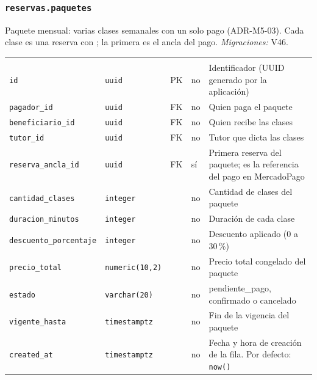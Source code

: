 \subsubsection{\texorpdfstring{\texttt{reservas.paquetes}}{reservas.paquetes}}\label{dd:reservas.paquetes}

Paquete mensual: varias clases semanales con un solo pago (ADR-M5-03). Cada clase es una reserva con ; la primera es el ancla del pago. \emph{Migraciones:} V46.

{\small
\begin{xltabular}{\textwidth}{@{}>{\raggedright\arraybackslash}p{3.6cm} >{\raggedright\arraybackslash}p{2.3cm} >{\raggedright\arraybackslash}p{1cm} >{\centering\arraybackslash}p{0.85cm} L@{}}
    \toprule
     &  &  &  &  \\
    \midrule
    \endfirsthead
    \toprule
     &  &  &  &  \\
    \midrule
    \endhead
    \bottomrule
    \endfoot
    \texttt{id} & \texttt{uuid} & PK & no & Identificador (UUID generado por la aplicación) \\
    \texttt{pagador\_\allowbreak{}id} & \texttt{uuid} & FK & no & Quien paga el paquete \\
    \texttt{beneficiario\_\allowbreak{}id} & \texttt{uuid} & FK & no & Quien recibe las clases \\
    \texttt{tutor\_\allowbreak{}id} & \texttt{uuid} & FK & no & Tutor que dicta las clases \\
    \texttt{reserva\_\allowbreak{}ancla\_\allowbreak{}id} & \texttt{uuid} & FK & sí & Primera reserva del paquete; es la referencia del pago en MercadoPago \\
    \texttt{cantidad\_\allowbreak{}clases} & \texttt{integer} &  & no & Cantidad de clases del paquete \\
    \texttt{duracion\_\allowbreak{}minutos} & \texttt{integer} &  & no & Duración de cada clase \\
    \texttt{descuento\_\allowbreak{}porcentaje} & \texttt{integer} &  & no & Descuento aplicado (0 a 30\,\%) \\
    \texttt{precio\_\allowbreak{}total} & \texttt{numeric(\allowbreak{}10,\allowbreak{}2)} &  & no & Precio total congelado del paquete \\
    \texttt{estado} & \texttt{varchar(\allowbreak{}20)} &  & no & pendiente\_pago, confirmado o cancelado \\
    \texttt{vigente\_\allowbreak{}hasta} & \texttt{timestamptz} &  & no & Fin de la vigencia del paquete \\
    \texttt{created\_\allowbreak{}at} & \texttt{timestamptz} &  & no & Fecha y hora de creación de la fila. Por defecto: \texttt{now(\allowbreak{})} \\
\end{xltabular}
}

